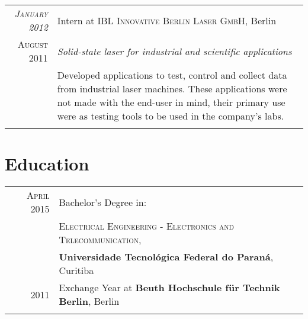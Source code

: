 \documentclass[a4paper,10pt]{article}
\begin{document}
\begin{tabular}{r|p{11cm}}
        \emph{\textsc{January 2012}} & Intern at \textsc
                                     {IBL Innovative Berlin Laser GmbH},
                                     Berlin \\

        \textsc{August 2011}         &\emph
                                     {Solid-state laser for industrial
                                        and scientific applications} \\
                                     &\footnotesize
                                     {
                                         Developed applications to test, control
                                         and collect data from industrial laser
                                         machines. These applications were not
                                         made with the end-user in mind, their
                                         primary use were as testing tools to be
                                         used in the company's labs.
                                     } \\
                                     \multicolumn{2}{c}{} \\
    \end{tabular}


\section{Education}
    \begin{tabular}{rl}
        \textsc{April} 2015 & Bachelor's Degree in: \\
                            &\textsc
                            {Electrical Engineering -
                                Electronics and Telecommunication},
                            \\
                            &\textbf
                            {Universidade Tecnológica
                                Federal do Paraná},
                            Curitiba \\

        \textsc{2011}       & Exchange Year at \textbf
                            {Beuth Hochschule für Technik Berlin},
                            Berlin \\ \\
    \end{tabular}
\end{document}

